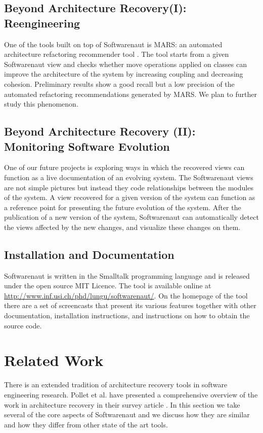 \documentclass[preprint,12pt]{elsarticle}
\begin{document}
\subsection {Beyond Architecture Recovery(I): Reengineering}
One of the tools built on top of Softwarenaut is MARS: an automated architecture refactoring recommender tool \cite{boeckmann-mars}. The tool starts from a given Softwarenaut view and checks whether move operations applied on classes can improve the architecture of the system by increasing coupling and decreasing cohesion. Preliminary results show a good recall but a low precision of the  automated refactoring recommendations generated by MARS. We plan to further study this phenomenon.


\subsection {Beyond Architecture Recovery (II): Monitoring Software Evolution}

One of our future projects is exploring ways in which the recovered views can function as a live documentation of an evolving system. The Softwarenaut views are not simple pictures but instead they code relationships between the modules of the system. A view recovered for a given version of the system can function as a reference point for presenting the future evolution of the system. After the publication of a new version of the system, Softwarenaut can automatically detect the views affected by the new changes, and visualize these changes on them.


\subsection {Installation and Documentation}
Softwarenaut is written in the Smalltalk programming language and is released under the open source MIT Licence. The tool is available online at {\footnotesize \url{http://www.inf.usi.ch/phd/lungu/softwarenaut/}}. On the homepage of the tool there are a set of screencasts that present its various features together with other documentation, installation instructions, and instructions on how to obtain the source code. 


\newpage
\section {Related Work}
\label {sec:rel}

There is an extended tradition of architecture recovery tools in software engineering research. Pollet et al. have presented a comprehensive overview of the work in architecture recovery in their survey article \cite{pollet-sar}. In this section we take several of the core aspects of Softwarenaut and we discuss how they are similar and how they differ from other state of the art tools.
\end{document}
